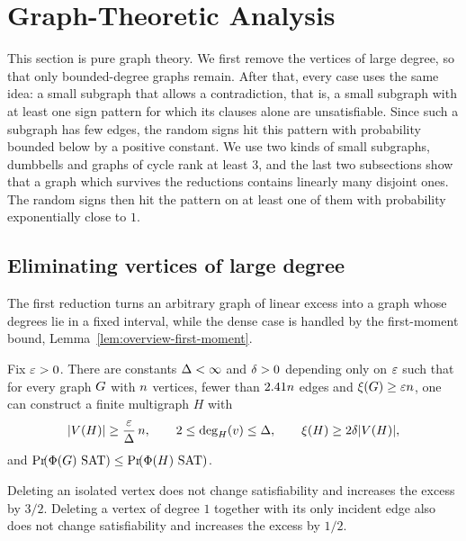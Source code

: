 \section{Graph-Theoretic Analysis}\label{sec:graph-analysis}
\label{sec:reduction-summary}

This section is pure graph theory. We first remove the vertices of large
degree, so that only bounded-degree graphs remain. After that, every case uses
the same idea: a small subgraph that allows a contradiction, that is, a small
subgraph with at least one sign pattern for which its clauses alone are
unsatisfiable. Since such a subgraph has few edges, the random signs hit this
pattern with probability bounded below by a positive constant. We use two kinds
of small subgraphs, dumbbells and graphs of cycle rank at least \(3\), and the
last two subsections show that a graph which survives the reductions contains
linearly many disjoint ones. The random signs then hit the pattern on at least
one of them with probability exponentially close to \(1\).

\subsection{Eliminating vertices of large degree}\label{subsec:bounded-core}

The first reduction turns an arbitrary graph of linear excess into a graph whose
degrees lie in a fixed interval, while the dense case is handled by the
first-moment bound, Lemma~\ref{lem:overview-first-moment}.

\begin{boundedcorerestatement}
Fix \(\varepsilon>0\). There are constants \(\Delta<\infty\) and \(\delta>0\)
depending only on \(\varepsilon\) such that for every graph \(G\) with
\(n\) vertices, fewer than \(2.41n\) edges and
\(\xi(G)\ge\varepsilon n\), one can construct a finite multigraph \(H\) with
\[
  |V(H)|\ge\frac{\varepsilon}{\Delta}\,n,
  \qquad
  2\le\deg_{H}(v)\le\Delta,
  \qquad
  \xi(H)\ge2\delta|V(H)|,
\]
and \(\Prx{\rform{\Gin}\SAT}\le\Prx{\rform{H}\SAT}\).
\end{boundedcorerestatement}

\begin{lemma}\label{lem:leaf}
Deleting an isolated vertex does not change satisfiability and increases the
excess by \(3/2\). Deleting a vertex of degree \(1\) together with its only
incident edge also does not change satisfiability and increases the excess by
\(1/2\).
\end{lemma}


